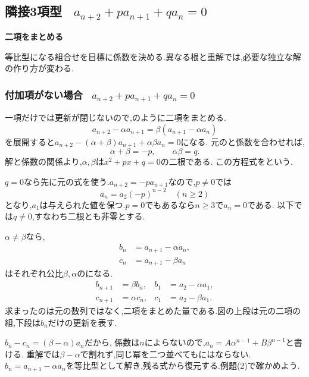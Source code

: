 
\subsection{\texorpdfstring{隣接3項型 \, $\displaystyle a_{n+2}+pa_{n+1}+qa_n=0$}{隣接3項型}}\label{節：隣接3項間漸化式型}
  \begin{bookpoint}
    \textbf{二項をまとめる}\par
    等比型になる組合せを目標に係数を決める.異なる根と重解では,必要な独立な解の作り方が変わる.
  \end{bookpoint}

  \subsubsection{\texorpdfstring{付加項がない場合 \, $\displaystyle a_{n+2}+pa_{n+1}+qa_n=0$}{付加項がない場合}}\label{節：二次特性方程式型}
    一項だけでは更新が閉じないので,のように二項をまとめる.
    \[
      a_{n+2}-\alpha a_{n+1}=\beta(a_{n+1}-\alpha a_n)
    \]
    を展開すると$a_{n+2}-(\alpha+\beta)a_{n+1}+\alpha\beta a_n=0$になる.
    元のと係数を合わせれば,
    \[
      \alpha+\beta=-p,\qquad\alpha\beta=q.
    \]
    解と係数の関係より,$\alpha,\beta$は$x^2+px+q=0$の二根である.
    この方程式をという.

    $q=0$なら先に元の式を使う.$a_{n+2}=-pa_{n+1}$なので,$p\ne0$では
    \[
      a_n=a_2(-p)^{n-2}\quad(n\ge2)
    \]
    となり,$a_1$は与えられた値を保つ.$p=0$でもあるなら$n\ge3$で$a_n=0$である.
    以下では$q\ne0$,すなわち二根とも非零とする.

    $\alpha\ne\beta$なら,
    \[
      \begin{aligned}
        b_n&=a_{n+1}-\alpha a_n,\\
        c_n&=a_{n+1}-\beta a_n
      \end{aligned}
    \]
    はそれぞれ公比$\beta,\alpha$のになる.
    \begin{align*}
      b_{n+1}&=\beta b_n,& b_1&=a_2-\alpha a_1,\\
      c_{n+1}&=\alpha c_n,& c_1&=a_2-\beta a_1.
    \end{align*}
    求まったのは元の数列ではなく,二項をまとめた量である.図の上段は元の二項の組,下段は$b_n$だけの更新を表す.
    \BookFigThreeTerm

    $b_n-c_n=(\beta-\alpha)a_n$だから,
    \BookMathLayout{\[
      a_n=\frac{(a_2-\alpha a_1)\beta^{n-1}-(a_2-\beta a_1)\alpha^{n-1}}{\beta-\alpha}.
    \]}{\[
      \begin{aligned}
        a_n&=\frac{a_2-\alpha a_1}{\beta-\alpha}\beta^{n-1}\\
           &\quad-\frac{a_2-\beta a_1}{\beta-\alpha}\alpha^{n-1}.
      \end{aligned}
    \]}
    係数は$n$によらないので,$a_n=A\alpha^{n-1}+B\beta^{n-1}$と書ける.
    重解では$\beta-\alpha$で割れず,同じ冪を二つ並べてもにはならない.
    $b_n=a_{n+1}-\alpha a_n$を等比型として解き,残る式から復元する.例題(2)で確かめよう.

